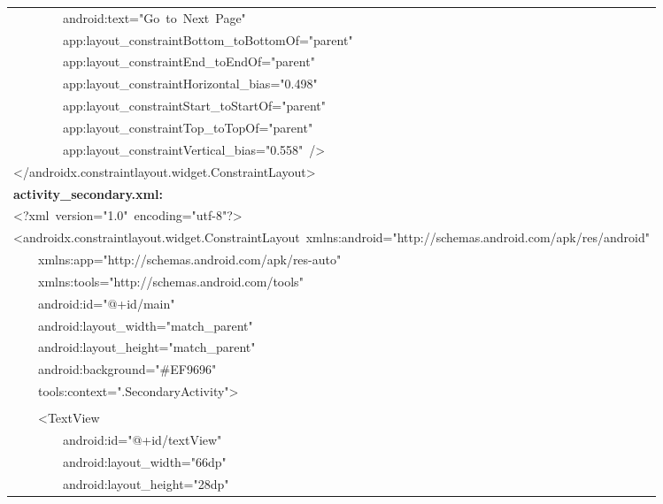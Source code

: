 \documentclass[a4paper,12pt]{article}
\begin{document}
\begin{longtable}{|p{}|}
{\ttfamily\small \ \ \ \ \ \ \ \ android:text="Go\ to\ Next\ Page"} \\
{\ttfamily\small \ \ \ \ \ \ \ \ app:layout\_constraintBottom\_toBottomOf="parent"} \\
{\ttfamily\small \ \ \ \ \ \ \ \ app:layout\_constraintEnd\_toEndOf="parent"} \\
{\ttfamily\small \ \ \ \ \ \ \ \ app:layout\_constraintHorizontal\_bias="0.498"} \\
{\ttfamily\small \ \ \ \ \ \ \ \ app:layout\_constraintStart\_toStartOf="parent"} \\
{\ttfamily\small \ \ \ \ \ \ \ \ app:layout\_constraintTop\_toTopOf="parent"} \\
{\ttfamily\small \ \ \ \ \ \ \ \ app:layout\_constraintVertical\_bias="0.558"\ /\textgreater{}} \\
{\ttfamily\small \textless{}/androidx.constraintlayout.widget.ConstraintLayout\textgreater{}} \\
\hline
\rule{0pt}{13pt}\textbf{activity\_secondary.xml:} \\
\hline
{\ttfamily\small \textless{}?xml\ version="1.0"\ encoding="utf-8"?\textgreater{}} \\
{\ttfamily\small \textless{}androidx.constraintlayout.widget.ConstraintLayout\ xmlns:android="http://schemas.android.com/apk/res/android"} \\
{\ttfamily\small \ \ \ \ xmlns:app="http://schemas.android.com/apk/res-auto"} \\
{\ttfamily\small \ \ \ \ xmlns:tools="http://schemas.android.com/tools"} \\
{\ttfamily\small \ \ \ \ android:id="@+id/main"} \\
{\ttfamily\small \ \ \ \ android:layout\_width="match\_parent"} \\
{\ttfamily\small \ \ \ \ android:layout\_height="match\_parent"} \\
{\ttfamily\small \ \ \ \ android:background="\#EF9696"} \\
{\ttfamily\small \ \ \ \ tools:context=".SecondaryActivity"\textgreater{}} \\
\strut \\
{\ttfamily\small \ \ \ \ \textless{}TextView} \\
{\ttfamily\small \ \ \ \ \ \ \ \ android:id="@+id/textView"} \\
{\ttfamily\small \ \ \ \ \ \ \ \ android:layout\_width="66dp"} \\
{\ttfamily\small \ \ \ \ \ \ \ \ android:layout\_height="28dp"} \\

\end{longtable}
\end{document}
